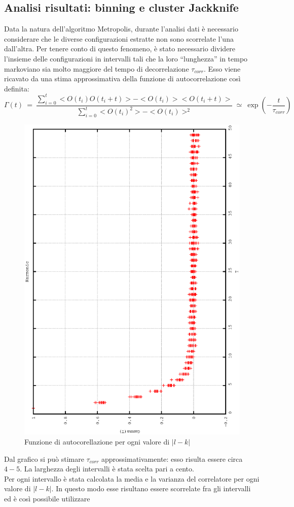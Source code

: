 \subsection{Analisi risultati: binning e cluster Jackknife}
Data la natura dell'algoritmo Metropolis, durante l'analisi dati è necessario considerare che le diverse configurazioni estratte non sono scorrelate l'una dall'altra.
Per tenere conto di questo fenomeno, è stato necessario dividere l'insieme delle configurazioni in intervalli tali
che la loro ``lunghezza'' in tempo markoviano sia molto maggiore del tempo di decorrelazione $\tau_{corr}$. Esso viene ricavato da una stima approssimativa
della funzione di autocorrelazione così definita:
$$
\Gamma(t) \ = \  \frac{ \sum_{i=0}^t <O(t_i)O(t_i + t)> - <O(t_i)><O(t_i + t)>}{\sum_{i=0}^t <{O(t_i)}^2> - <O(t_i)>^2} \ \simeq \ \exp{\left(-\frac{t}{\tau_{corr}}\right)}
$$
\begin{figure}[ht]
  \includegraphics[width= 0.7\columnwidth,angle = -90]{gamma_t.eps}
  \caption{Funzione di autocorellazione per ogni valore di $|l-k|$}
\end{figure}
Dal grafico si può stimare $\tau_{corr}$ approssimativamente: esso risulta essere circa $4-5$. La larghezza degli intervalli è stata scelta pari a cento.\\
Per ogni intervallo è stata calcolata la media e la varianza del correlatore per ogni valore di $|l-k|$. In questo modo esse risultano essere scorrelate fra gli intervalli ed è così possibile utilizzare
